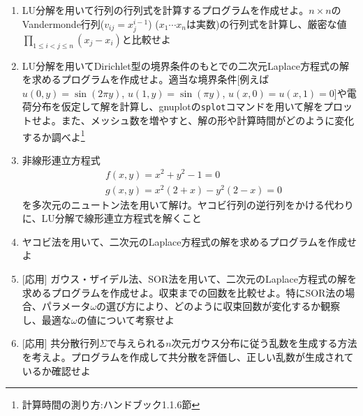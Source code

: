 \documentclass[11pt]{jarticle}
\begin{document}
\noindent {\bf [連立一次方程式]}
\begin{enumerate}
\renewcommand{\labelenumi}{3-\arabic{enumi})}

\item LU分解を用いて行列の行列式を計算するプログラムを作成せよ。$n \times n$のVandermonde行列($v_{ij}=x_j^{i-1}$) ($x_1 \cdots x_n$は実数)の行列式を計算し、厳密な値$\displaystyle \prod_{1 \le i < j \le n} (x_j-x_i)$と比較せよ
  
\item LU分解を用いてDirichlet型の境界条件のもとでの二次元Laplace方程式の解を求めるプログラムを作成せよ。適当な境界条件[例えば$u(0,y) = \sin(2 \pi y)$, $u(1,y) = \sin(\pi y)$, $u(x,0)=u(x,1)=0$]や電荷分布を仮定して解を計算し、gnuplotの{\tt splot}コマンドを用いて解をプロットせよ。また、メッシュ数を増やすと、解の形や計算時間がどのように変化するか調べよ\footnote{計算時間の測り方:ハンドブック1.1.6節}

\item 非線形連立方程式
  \begin{align*}
    & f(x,y) = x^2 + y^2 - 1 = 0 \\
    & g(x,y) = x^2(2+x) - y^2 (2-x) = 0
  \end{align*}
  を多次元のニュートン法を用いて解け。ヤコビ行列の逆行列をかける代わりに、LU分解で線形連立方程式を解くこと

\item ヤコビ法を用いて、二次元のLaplace方程式の解を求めるプログラムを作成せよ

\item \mbox{} [応用] ガウス・ザイデル法、SOR法を用いて、二次元のLaplace方程式の解を求めるプログラムを作成せよ。収束までの回数を比較せよ。特にSOR法の場合、パラメータ$\omega$の選び方により、どのように収束回数が変化するか観察し、最適な$\omega$の値について考察せよ

\item \mbox{} [応用] 共分散行列$\Sigma$で与えられる$n$次元ガウス分布に従う乱数を生成する方法を考えよ。プログラムを作成して共分散を評価し、正しい乱数が生成されているか確認せよ

\end{enumerate}
\end{document}

